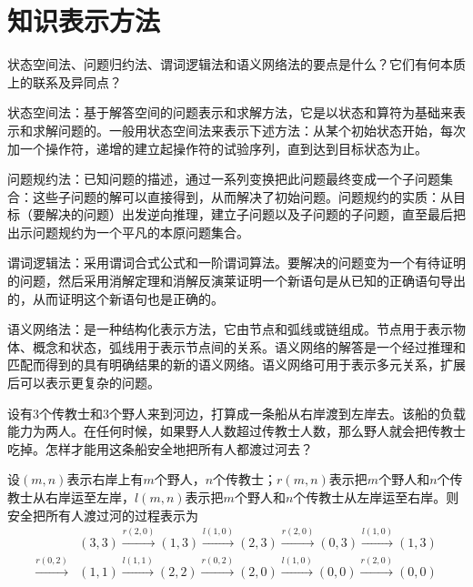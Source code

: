 \chapter{知识表示方法}

\begin{question}
状态空间法、问题归约法、谓词逻辑法和语义网络法的要点是什么？它们有何本质上的联系及异同点？
\end{question}	
\begin{solution}
状态空间法：基于解答空间的问题表示和求解方法，它是以状态和算符为基础来表示和求解问题的。一般用状态空间法来表示下述方法：从某个初始状态开始，每次加一个操作符，递增的建立起操作符的试验序列，直到达到目标状态为止。 \par
问题规约法：已知问题的描述，通过一系列变换把此问题最终变成一个子问题集合：这些子问题的解可以直接得到，从而解决了初始问题。问题规约的实质：从目标（要解决的问题）出发逆向推理，建立子问题以及子问题的子问题，直至最后把出示问题规约为一个平凡的本原问题集合。 \par
谓词逻辑法：采用谓词合式公式和一阶谓词算法。要解决的问题变为一个有待证明的问题，然后采用消解定理和消解反演莱证明一个新语句是从已知的正确语句导出的，从而证明这个新语句也是正确的。\par
语义网络法：是一种结构化表示方法，它由节点和弧线或链组成。节点用于表示物体、概念和状态，弧线用于表示节点间的关系。语义网络的解答是一个经过推理和匹配而得到的具有明确结果的新的语义网络。语义网络可用于表示多元关系，扩展后可以表示更复杂的问题。
\end{solution}

\begin{question}
设有$3$个传教士和$3$个野人来到河边，打算成一条船从右岸渡到左岸去。该船的负载能力为两人。在任何时候，如果野人人数超过传教士人数，那么野人就会把传教士吃掉。怎样才能用这条船安全地把所有人都渡过河去？
\end{question}
\begin{solution}
设$(m,n)$表示右岸上有$m$个野人，$n$个传教士；$r(m,n)$表示把$m$个野人和$n$个传教士从右岸运至左岸，$l(m,n)$表示把$m$个野人和$n$个传教士从左岸运至右岸。则安全把所有人渡过河的过程表示为
\begin{align*}
& (3,3) \xrightarrow{r(2,0)} (1,3) \xrightarrow{l(1,0)} (2,3) 
	\xrightarrow{r(2,0)} (0,3) \xrightarrow{l(1,0)} (1,3) \\
	\xrightarrow{r(0,2)} & (1,1) \xrightarrow{l(1,1)} (2,2) 
	\xrightarrow{r(0,2)} (2,0) \xrightarrow{l(1,0)} (0,0) \xrightarrow{r(2,0)} (0,0)
\end{align*}
\end{solution}

